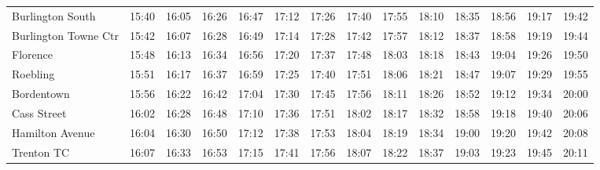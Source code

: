 \begin{center}
\begin{tabular}{@{}lrrrrrrrrrrrrr@{}}
Burlington South & 15:40 & 16:05 & 16:26 & 16:47 & 17:12 & 17:26 & 17:40 & 17:55 & 18:10 & 18:35 & 18:56 & 19:17 & 19:42 \\
Burlington Towne Ctr & 15:42 & 16:07 & 16:28 & 16:49 & 17:14 & 17:28 & 17:42 & 17:57 & 18:12 & 18:37 & 18:58 & 19:19 & 19:44 \\
Florence & 15:48 & 16:13 & 16:34 & 16:56 & 17:20 & 17:37 & 17:48 & 18:03 & 18:18 & 18:43 & 19:04 & 19:26 & 19:50 \\
Roebling & 15:51 & 16:17 & 16:37 & 16:59 & 17:25 & 17:40 & 17:51 & 18:06 & 18:21 & 18:47 & 19:07 & 19:29 & 19:55 \\
Bordentown & 15:56 & 16:22 & 16:42 & 17:04 & 17:30 & 17:45 & 17:56 & 18:11 & 18:26 & 18:52 & 19:12 & 19:34 & 20:00 \\
Cass Street & 16:02 & 16:28 & 16:48 & 17:10 & 17:36 & 17:51 & 18:02 & 18:17 & 18:32 & 18:58 & 19:18 & 19:40 & 20:06 \\
Hamilton Avenue & 16:04 & 16:30 & 16:50 & 17:12 & 17:38 & 17:53 & 18:04 & 18:19 & 18:34 & 19:00 & 19:20 & 19:42 & 20:08 \\
Trenton TC & 16:07 & 16:33 & 16:53 & 17:15 & 17:41 & 17:56 & 18:07 & 18:22 & 18:37 & 19:03 & 19:23 & 19:45 & 20:11 \\
\bottomrule\end{tabular}\end{center}
